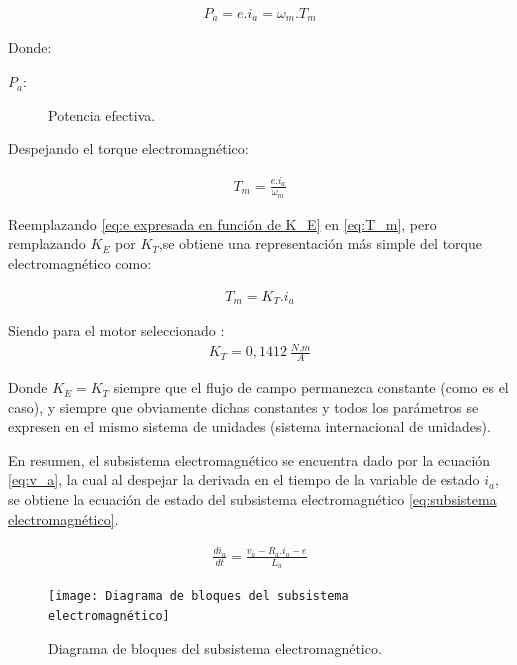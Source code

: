 \documentclass{article}
\begin{document}
\begin{sloppypar}
\begin{align}   \label{eq:P_a}
    P_a=e.i_a=\omega_m.T_m
\end{align}

Donde:
\begin{description}
	\item[$P_a:$] Potencia efectiva.
\end{description}

Despejando el torque electromagnético:

\begin{align}   \label{eq:T_m}
    T_m=\frac{e.i_a}{\omega_m}
\end{align}

Reemplazando \ref{eq:e expresada en función de K_E} en \ref{eq:T_m}, pero remplazando $K_E$ por $K_T$,se obtiene una representación más simple del torque electromagnético como:

\begin{align}   \label{eq:T_m expresada en función de K_T}
    T_m=K_T.i_a
\end{align}

Siendo para el motor seleccionado \cite{MoogMotorDatasheet}:
\begin{align}   \label{eq:Valor de K_T}
    K_T=0,1412\ \frac{N.m}{A}
\end{align}

Donde $K_E=K_T$ siempre que el flujo de campo permanezca constante (como es el caso), y siempre que obviamente dichas constantes y todos los parámetros se expresen en el mismo sistema de unidades (sistema internacional de unidades).

En resumen, el subsistema electromagnético se encuentra dado por la ecuación \ref{eq:v_a}, la cual al despejar la derivada en el tiempo de la variable de estado $i_a$, se obtiene la ecuación de estado del subsistema electromagnético \ref{eq:subsistema electromagnético}.

\begin{align}   \label{eq:subsistema electromagnético}
    \frac{di_a}{dt}=\frac{v_a-R_a.i_a-e}{L_a}
\end{align}



\begin{figure}[H]
    \centering
    \texttt{[image: Diagrama de bloques del subsistema electromagnético]}
    \caption{Diagrama de bloques del subsistema electromagnético.}
    \label{fig:Diagrama de bloques del subsistema electromagnético}
\end{figure}


\end{sloppypar}
\end{document}
